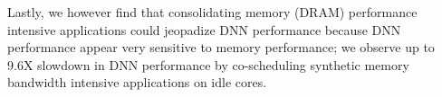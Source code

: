 Lastly, we however find that consolidating memory (DRAM) performance
intensive applications could jeopadize DNN performance because DNN
performance appear very sensitive to memory performance; we observe up
to 9.6X slowdown in DNN performance by co-scheduling synthetic memory 
bandwidth intensive applications on idle cores.








